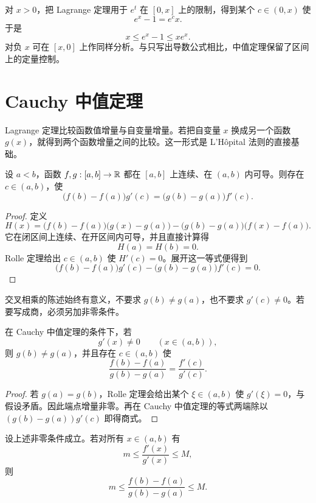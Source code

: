 \begin{example}[指数函数的基本估计]
对 \(x>0\)，把 Lagrange 定理用于 \(e^t\) 在 \([0,x]\) 上的限制，得到某个 \(c\in(0,x)\) 使
\[
 e^x-1=e^c x.
\]
于是
\[
 x\le e^x-1\le xe^x.
\]
对负 \(x\) 可在 \([x,0]\) 上作同样分析。与只写出导数公式相比，中值定理保留了区间上的定量控制。
\end{example}

\section{Cauchy 中值定理}
\label{sec:cauchy-mean-value}

Lagrange 定理比较函数值增量与自变量增量。若把自变量 \(x\) 换成另一个函数 \(g(x)\)，就得到两个函数增量之间的比较。这一形式是 L'Hôpital 法则的直接基础。

\begin{theorem}
\label{thm:cauchy-mvt}
设 \(a<b\)，函数 \(f,g:[a,b]\to\mathbb{R}\) 都在 \([a,b]\) 上连续、在 \((a,b)\) 内可导。则存在 \(c\in(a,b)\)，使
\[
 \bigl(f(b)-f(a)\bigr)g'(c)
 =
 \bigl(g(b)-g(a)\bigr)f'(c).
\]
\end{theorem}

\begin{proof}
定义
\[
 H(x)=\bigl(f(b)-f(a)\bigr)\bigl(g(x)-g(a)\bigr)
      -\bigl(g(b)-g(a)\bigr)\bigl(f(x)-f(a)\bigr).
\]
它在闭区间上连续、在开区间内可导，并且直接计算得
\[
 H(a)=H(b)=0.
\]
Rolle 定理给出 \(c\in(a,b)\) 使 \(H'(c)=0\)。展开这一等式便得到
\[
 \bigl(f(b)-f(a)\bigr)g'(c)
 -
 \bigl(g(b)-g(a)\bigr)f'(c)=0.
\]
\end{proof}

交叉相乘的陈述始终有意义，不要求 \(g(b)\ne g(a)\)，也不要求 \(g'(c)\ne0\)。若要写成商，必须另加非零条件。

\begin{corollary}[增量比形式]
\label{cor:cauchy-mvt-ratio}
在 Cauchy 中值定理的条件下，若
\[
 g'(x)\ne0\qquad(x\in(a,b)),
\]
则 \(g(b)\ne g(a)\)，并且存在 \(c\in(a,b)\) 使
\[
 \frac{f(b)-f(a)}{g(b)-g(a)}
 =\frac{f'(c)}{g'(c)}.
\]
\end{corollary}

\begin{proof}
若 \(g(a)=g(b)\)，Rolle 定理会给出某个 \(\xi\in(a,b)\) 使 \(g'(\xi)=0\)，与假设矛盾。因此端点增量非零。再在 Cauchy 中值定理的等式两端除以
\((g(b)-g(a))g'(c)\) 即得商式。
\end{proof}

\begin{corollary}[导数比控制增量比]
\label{cor:derivative-ratio-controls-increments}
设上述非零条件成立。若对所有 \(x\in(a,b)\) 有
\[
 m\le\frac{f'(x)}{g'(x)}\le M,
\]
则
\[
 m\le
 \frac{f(b)-f(a)}{g(b)-g(a)}
 \le M.
\]
\end{corollary}


